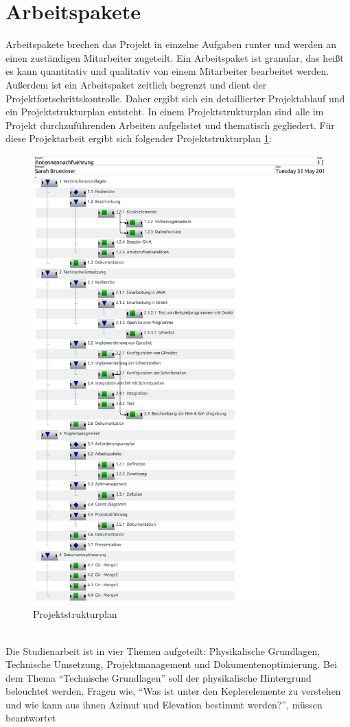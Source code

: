 \section{Arbeitspakete}
Arbeitspakete brechen das Projekt in einzelne Aufgaben runter und werden an einen 
zuständigen Mitarbeiter zugeteilt. Ein Arbeitspaket ist granular, das heißt es kann quantitativ und 
qualitativ von einem Mitarbeiter bearbeitet werden. Außerdem ist ein Arbeitspaket zeitlich begrenzt 
und dient der Projektfortschrittskontrolle. 
Daher ergibt sich ein detaillierter Projektablauf und ein Projektstrukturplan entsteht. In einem 
Projektstrukturplan sind alle im Projekt durchzuführenden Arbeiten aufgelistet und thematisch 
gegliedert. Für diese Projektarbeit ergibt sich folgender Projektstrukturplan 
\ref{fig:projektstruktur}:\\
\begin{figure}[h]
 \centering
\includegraphics[width=0.6\linewidth]{./images/00tasks}
\caption{Projektstrukturplan}
 \label{fig:projektstruktur}
\end{figure}
\\
Die Studienarbeit ist in vier Themen aufgeteilt: Physikalische Grundlagen, Technische Umsetzung, 
Projektmanagement und Dokumentenoptimierung. Bei dem Thema ``Technische Grundlagen'' soll der 
physikalische Hintergrund beleuchtet werden. Fragen wie, ``Was ist unter den Keplerelemente zu 
verstehen und wie kann aus ihnen Azimut und Elevation bestimmt werden?'', müssen beantwortet 
